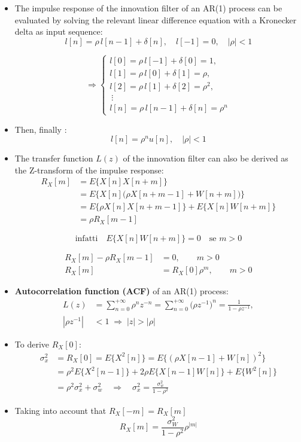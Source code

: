 \begin{itemize}
    \item The impulse response of the innovation filter of an AR(1) process can be evaluated by solving the relevant linear difference equation with a Kronecker delta as input sequence:
    \[
l[n] = \rho\,l[n-1] + \delta[n], \quad l[-1]=0,\quad |\rho|<1
\]

\[
\Longrightarrow
\begin{cases}
l[0] = \rho\,l[-1] + \delta[0] = 1,\\[4pt]
l[1] = \rho\,l[0] + \delta[1] = \rho,\\[4pt]
l[2] = \rho\,l[1] + \delta[2] = \rho^{2},\\
\ \vdots \\[4pt]
l[n] = \rho\,l[n-1] + \delta[n] = \rho^{n}
\end{cases}
\]
\item Then, finally :
\[
l[n]=\rho^nu[n],\quad|\rho|<1
\]
\item The transfer function \(L(z)\) of the innovation filter can also be derived as the Z-transform of the impulse response:
\begin{align*}
R_{X}[m]
  &= E\{X[n] X[n+m]\} \\[4pt]
  &= E\{X[n]\bigl(\rho X[n+m-1] + W[n+m]\bigr)\} \\[4pt]
  &= E\{\rho X[n] X[n+m-1]\} + E\{X[n] W[n+m]\} \\[4pt]
  &= \rho R_{X}[m-1]
\end{align*}

\[
\text{infatti}\quad E\{X[n] W[n+m]\} = 0 \quad \text{se } m>0
\]

\begin{align*}
R_{X}[m] - \rho R_{X}[m-1] &= 0, \qquad m>0 \\[4pt]
R_{X}[m] &= R_{X}[0]\rho^{m}, \qquad m>0
\end{align*}


\item \textbf{Autocorrelation function (ACF)} of an AR(1) process:
\begin{align*}
L(z)
  &= \sum_{n=0}^{+\infty} \rho^{n} z^{-n}
   = \sum_{n=0}^{+\infty} \bigl(\rho z^{-1}\bigr)^{n}
   = \frac{1}{1 - \rho z^{-1}}, \\[4pt]
|\rho z^{-1}| &< 1 \;\Longrightarrow\; |z| > |\rho|
\end{align*}

\item To derive \(R_X[0]\):
\begin{align*}
\sigma_{x}^{2}
  &= R_{X}[0]
   = E\{X^{2}[n]\}
   = E\bigl\{(\rho X[n-1] + W[n])^{2}\bigr\} \\[4pt]
  &= \rho^{2} E\{X^{2}[n-1]\}
   + 2\rho E\{X[n-1] W[n]\}
   + E\{W^{2}[n]\} \\[4pt]
  &= \rho^{2} \sigma_{x}^{2} + \sigma_{w}^{2}\quad\Longrightarrow\quad\sigma_{x}^{2}
  = \frac{\sigma_{w}^{2}}{1 - \rho^{2}}
\end{align*}
\item Taking into account that \(R_X[-m]=R_X[m]\)
\[
R_X[m]=\frac{\sigma_W^2}{1-\rho^2}\rho^{|m|}
\]


\end{itemize}
